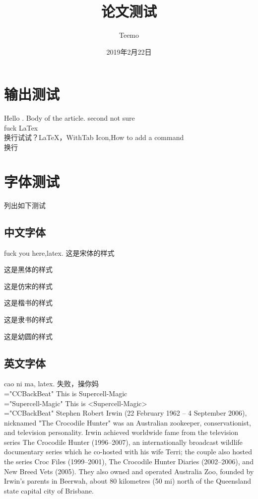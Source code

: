 \documentclass[UTF8]{article}
\title{论文测试}
\author{Teemo}
\date{2019年2月22日}
\begin{document}
\maketitle
\tableofcontents
\section{输出测试}
 Hello \XeLaTeX.
 Body of the article.
 second not sure \\
 fuck LaTex \\
 换行试试？\LaTeX，WithTab Icon,How to add a command \\

 换行
\section{字体测试}
 列出如下测试
 \subsection{中文字体}
     fuck you here,latex.
     {\songti   这是宋体的样式} \par
     {\heiti    这是黑体的样式} \par
     {\fangsong 这是仿宋的样式} \par
     {\kaishu   这是楷书的样式} \par
     {\lishu   这是隶书的样式} \par
     {\youyuan 这是幼圆的样式} \par
 \subsection{英文字体}
     cao ni ma, latex.
     失败，操你妈\\
     {\font\rm="CCBackBeat" \rm This is Supercell-Magic\\}
     {\font\rm="Supercell-Magic" \rm This is <Supercell-Magic>\\}
     {\font\rm="CCBackBeat" \rm Stephen Robert Irwin (22 February 1962 – 4 September 2006),
     nicknamed "The Crocodile Hunter" was an Australian zookeeper, conservationist, and
     television personality. Irwin achieved worldwide fame from the television series The
     Crocodile Hunter (1996–2007), an internationally broadcast wildlife documentary series
     which he co-hosted with his wife Terri; the couple also hosted the series Croc Files
     (1999–2001), The Crocodile Hunter Diaries (2002–2006), and New Breed Vets (2005).
     They also owned and operated Australia Zoo, founded by Irwin's parents in Beerwah,
     about 80 kilometres (50 mi) north of the Queensland state capital city of Brisbane.}\\
\end{document}
